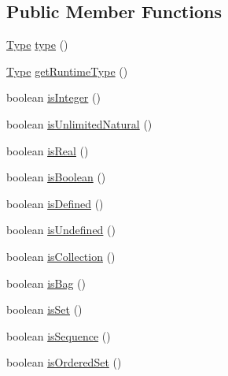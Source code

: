 \subsection*{Public Member Functions}
\begin{DoxyCompactItemize}
\item 
\hyperlink{interfaceorg_1_1tzi_1_1use_1_1uml_1_1ocl_1_1type_1_1_type}{Type} \hyperlink{classorg_1_1tzi_1_1use_1_1uml_1_1ocl_1_1value_1_1_value_a700029c1893d04e46bca4b5c2ffd81aa}{type} ()
\item 
\hyperlink{interfaceorg_1_1tzi_1_1use_1_1uml_1_1ocl_1_1type_1_1_type}{Type} \hyperlink{classorg_1_1tzi_1_1use_1_1uml_1_1ocl_1_1value_1_1_value_af90dd08e2a64b199501ed9c1c2f28723}{get\-Runtime\-Type} ()
\item 
boolean \hyperlink{classorg_1_1tzi_1_1use_1_1uml_1_1ocl_1_1value_1_1_value_ab9d678d4bcb3a30d13075508a7119b1d}{is\-Integer} ()
\item 
boolean \hyperlink{classorg_1_1tzi_1_1use_1_1uml_1_1ocl_1_1value_1_1_value_a3185dcbd8ccf0754e0fdfc6a3f729775}{is\-Unlimited\-Natural} ()
\item 
boolean \hyperlink{classorg_1_1tzi_1_1use_1_1uml_1_1ocl_1_1value_1_1_value_a3d2e03d38339cf3aa035c896afd3326a}{is\-Real} ()
\item 
boolean \hyperlink{classorg_1_1tzi_1_1use_1_1uml_1_1ocl_1_1value_1_1_value_a8607443c99d04ddd9e6c0d0225a58aaa}{is\-Boolean} ()
\item 
boolean \hyperlink{classorg_1_1tzi_1_1use_1_1uml_1_1ocl_1_1value_1_1_value_aab98c085cfaa9592591a0ea7659f388a}{is\-Defined} ()
\item 
boolean \hyperlink{classorg_1_1tzi_1_1use_1_1uml_1_1ocl_1_1value_1_1_value_ae9dee8ea18e7c4c7eb17267c273f3125}{is\-Undefined} ()
\item 
boolean \hyperlink{classorg_1_1tzi_1_1use_1_1uml_1_1ocl_1_1value_1_1_value_a6df880e47dbf7b36b9ff2172f225032d}{is\-Collection} ()
\item 
boolean \hyperlink{classorg_1_1tzi_1_1use_1_1uml_1_1ocl_1_1value_1_1_value_a7448484421d539ffaab2c809e7ce16a2}{is\-Bag} ()
\item 
boolean \hyperlink{classorg_1_1tzi_1_1use_1_1uml_1_1ocl_1_1value_1_1_value_aa5856e3bd962de9d84079d482e6c13a1}{is\-Set} ()
\item 
boolean \hyperlink{classorg_1_1tzi_1_1use_1_1uml_1_1ocl_1_1value_1_1_value_abd9dcd6491b9ee4c20c89ae44f970a6e}{is\-Sequence} ()
\item 
boolean \hyperlink{classorg_1_1tzi_1_1use_1_1uml_1_1ocl_1_1value_1_1_value_af46d01f0cd1c00f17a9ceb94087cb8bb}{is\-Ordered\-Set} ()

\end{DoxyCompactItemize}
